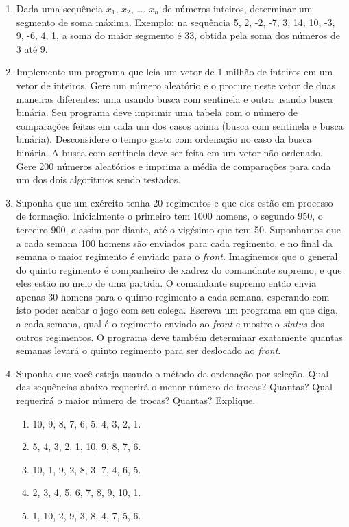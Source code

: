 \begin{enumerate}
\item Dada  uma  sequência  $x_1$,  $x_2$, \ldots,  $x_n$  de  
números  inteiros,
determinar um segmento de soma  máxima.  Exemplo: na sequência 5, 2, -2,
-7, 3, 14,  10, -3, 9, -6, 4,  1, a soma do maior segmento  é 33, obtida
pela soma dos números de 3 até 9. 
 
\item Implemente um programa que leia um vetor de 1 milhão de inteiros
   em um vetor de inteiros. Gere um número aleatório e o procure
   neste vetor de duas maneiras diferentes: uma usando busca com 
   sentinela e outra usando busca binária. Seu programa deve imprimir
   uma tabela com o número de comparações feitas em cada um dos casos
   acima (busca com sentinela e busca binária). Desconsidere o tempo
   gasto com ordenação no caso da busca binária. A busca com sentinela
   deve ser feita em um vetor não ordenado. Gere 200 números aleatórios
   e imprima a média de comparações para cada um dos dois algoritmos
   sendo testados.

\item 
Suponha que um ex\'ercito tenha 20 regimentos e que eles est\~ao em processo
de forma\c c\~ao. Inicialmente o primeiro tem 1000 homens, o segundo 950,
o terceiro 900, e assim por diante, at\'e o vig\'esimo que tem 50. Suponhamos
que a cada semana 100 homens s\~ao enviados para cada regimento, e no final
da semana o maior regimento \'e enviado para o {\em front}. Imaginemos que o
general do quinto regimento \'e companheiro de xadrez do comandante supremo,
e que eles est\~ao no meio de uma partida. O comandante supremo ent\~ao
envia apenas 30 homens para o quinto regimento a cada semana, esperando com
isto poder acabar o jogo com seu colega.
Escreva um programa em 
que diga, a cada semana, qual \'e o regimento enviado ao {\em front} e mostre o {\em status} dos outros regimentos. O programa
deve tamb\'em determinar exatamente quantas semanas levar\'a o quinto regimento
para ser deslocado ao {\em front}. 

\item Suponha que voc\^e esteja usando o m\'etodo da ordenação 
por sele\c c\~ao. Qual das sequências abaixo requerir\'a o menor n\'umero
de trocas? Quantas? Qual requerir\'a o maior n\'umero de trocas? Quantas?
Explique.
\begin {enumerate}
\item 10, 9, 8, 7, 6, 5, 4, 3, 2, 1.
\item 5, 4, 3, 2, 1, 10, 9, 8, 7, 6.
\item 10, 1, 9, 2, 8, 3, 7, 4, 6, 5.
\item 2, 3, 4, 5, 6, 7, 8, 9, 10, 1.
\item 1, 10, 2, 9, 3, 8, 4, 7, 5, 6.
\end {enumerate}


\end{enumerate}

